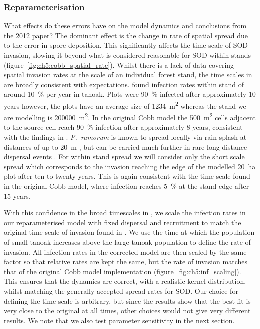 \subsubsection{Reparameterisation}\label{sec:ch5:reparameterisation}

What effects do these errors have on the model dynamics and conclusions from the 2012 paper? The dominant effect is the change in rate of spatial spread due to the error in spore deposition. This significantly affects the time scale of SOD invasion, slowing it beyond what is considered reasonable for SOD within stands (figure~\ref{fig:ch5:cobb_spatial_rate}). Whilst there is a lack of data covering spatial invasion rates at the scale of an individual forest stand, the time scales in \citet{cobb_ecosystem_2012} are broadly consistent with expectations. \citet{mcpherson_responses_2010} found infection rates within stand of around \SI{10}{\percent} per year in tanoak. Plots were \SI{90}{\percent} infected after approximately 10 years however, the plots have an average size of \SI{1234}{\meter\squared} whereas the stand we are modelling is \SI{200000}{\meter\squared}. In the original Cobb model the \SI{500}{\meter\squared} cells adjacent to the source cell reach \SI{90}{\percent} infection after approximately 8 years, consistent with the findings in \citet{mcpherson_responses_2010}. \textit{P.~ramorum} is known to spread locally via rain splash at distances of up to \SI{20}{\meter} \citep{davidson_transmission_2005}, but can be carried much further in rare long distance dispersal events \citep{meentemeyer_epidemiological_2011}. For within stand spread we will consider only the short scale spread which corresponds to the invasion reaching the edge of the modelled \SI{20}{\hectare} plot after ten to twenty years. This is again consistent with the time scale found in the original Cobb model, where infection reaches \SI{5}{\percent} at the stand edge after 15 years.

With this confidence in the broad timescales in \citet{cobb_ecosystem_2012}, we scale the infection rates in our reparameterised model with fixed dispersal and recruitment to match the original time scale of invasion found in \citet{cobb_ecosystem_2012}. We use the time at which the population of small tanoak increases above the large tanoak population to define the rate of invasion. All infection rates in the corrected model are then scaled by the same factor so that relative rates are kept the same, but the rate of invasion matches that of the original Cobb model implementation (figure~\ref{fig:ch5:inf_scaling}). This ensures that the dynamics are correct, with a realistic kernel distribution, whilst matching the generally accepted spread rates for SOD\@. Our choice for defining the time scale is arbitrary, but since the results show that the best fit is very close to the original at all times, other choices would not give very different results. We note that we also test parameter sensitivity in the next section.


